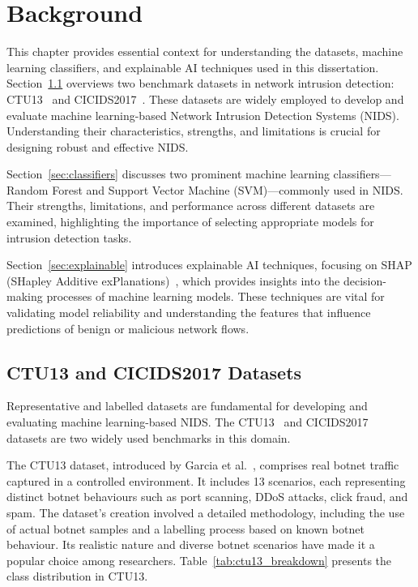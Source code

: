 \chapter{Background}\label{chap:background}

This chapter provides essential context for understanding the datasets, machine learning classifiers, and explainable AI techniques used in this dissertation. Section~\ref{sec:datasets} overviews two benchmark datasets in network intrusion detection: CTU13~\cite{garcia2014empirical} and CICIDS2017~\cite{sharafaldin2018toward}. These datasets are widely employed to develop and evaluate machine learning-based Network Intrusion Detection Systems (NIDS). Understanding their characteristics, strengths, and limitations is crucial for designing robust and effective NIDS.

Section~\ref{sec:classifiers} discusses two prominent machine learning classifiers—Random Forest and Support Vector Machine (SVM)—commonly used in NIDS. Their strengths, limitations, and performance across different datasets are examined, highlighting the importance of selecting appropriate models for intrusion detection tasks.

Section~\ref{sec:explainable} introduces explainable AI techniques, focusing on SHAP (SHapley Additive exPlanations)~\cite{lundberg2017unified}, which provides insights into the decision-making processes of machine learning models. These techniques are vital for validating model reliability and understanding the features that influence predictions of benign or malicious network flows.

\section{CTU13 and CICIDS2017 Datasets}\label{sec:datasets}

Representative and labelled datasets are fundamental for developing and evaluating machine learning-based NIDS. The CTU13~\cite{garcia2014empirical} and CICIDS2017~\cite{sharafaldin2018toward} datasets are two widely used benchmarks in this domain.

The CTU13 dataset, introduced by Garcia et al.~\cite{garcia2014empirical}, comprises real botnet traffic captured in a controlled environment. It includes 13 scenarios, each representing distinct botnet behaviours such as port scanning, DDoS attacks, click fraud, and spam. The dataset’s creation involved a detailed methodology, including the use of actual botnet samples and a labelling process based on known botnet behaviour. Its realistic nature and diverse botnet scenarios have made it a popular choice among researchers. Table~\ref{tab:ctu13_breakdown} presents the class distribution in CTU13.

